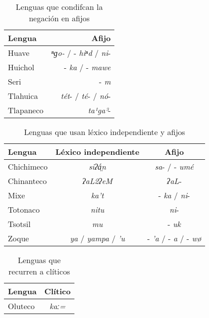 \begin{table}[htbp]
\centering
\begin{tabular}{lr}
\textbf{Lengua} & \textbf{Afijo} \\
\hline
Huave & {\setmainfont{Charis SIL} \textit{ⁿɡo-}} / -{\setmainfont{Charis SIL} \textit{hiⁿd}} / {\setmainfont{Charis SIL} \textit{ni}}- \\
Huichol & -{\setmainfont{Charis SIL} \textit{ka}} / -{\setmainfont{Charis SIL} \textit{mawe}} \\
Seri  & -{\setmainfont{Charis SIL} \textit{m}} \\
Tlahuica & {\setmainfont{Charis SIL} \textit{tét}}- / {\setmainfont{Charis SIL} \textit{té}}- / {\setmainfont{Charis SIL} \textit{nó}}- \\
Tlapaneco & {\setmainfont{Charis SIL} \textit{ta¹ga³}}- \\
\hline
\end{tabular}
\caption{Lenguas que condifcan la negación en afijos}
\label{cuadro3}
\end{table}

\begin{table}[htbp]
\centering
\begin{tabular}{lcc}
\textbf{Lengua} & \textbf{Léxico independiente} & \textbf{Afijo} \\
\hline
Chichimeco & {\setmainfont{Charis SIL} \textit{siʔá̤n}} & {\setmainfont{Charis SIL} \textit{sa}}- / -{\setmainfont{Charis SIL} \textit{umé}}  \\
Chinanteco & {\setmainfont{Charis SIL} \textit{ʔaL2ʔeM}} & {\setmainfont{Charis SIL} \textit{ʔaL}}- \\
Mixe  & {\setmainfont{Charis SIL} \textit{ka’t}}  & -{\setmainfont{Charis SIL} \textit{ka}} / {\setmainfont{Charis SIL} \textit{ni}}- \\
Totonaco & {\setmainfont{Charis SIL} \textit{nitu}}  & {\setmainfont{Charis SIL} \textit{ni}}- \\
Tsotsil & {\setmainfont{Charis SIL} \textit{mu}}    & -{\setmainfont{Charis SIL} \textit{uk}} \\
Zoque & {\setmainfont{Charis SIL} \textit{ya}} / {\setmainfont{Charis SIL} \textit{yampa}} / {\setmainfont{Charis SIL} \textit{’u}}  & -{\setmainfont{Charis SIL} \textit{’a}} / -{\setmainfont{Charis SIL} \textit{a}} / -{\setmainfont{Charis SIL} \textit{wø}} \\
\hline
\end{tabular}
\caption{Lenguas que usan léxico independiente y afijos}
\label{cuadro4}
\end{table}
  
\begin{table}[htbp]
\centering  
\begin{tabular}{lc}
\textbf{Lengua} & \textbf{Clítico} \\
\hline
Oluteco & {\setmainfont{Charis SIL} \textit{kaː=}} \\
\hline
\end{tabular}
\caption{Lenguas que recurren a clíticos}
\label{cuadro5}
\end{table}
  